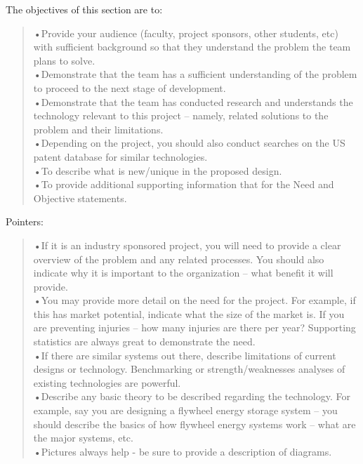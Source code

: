 \begin{enumerate}
\begin{onlysolution}
The objectives of this section are to:
\begin{quote}
•Provide your audience (faculty, project sponsors, other students, etc)
with sufficient background so that they understand the problem the team
plans to solve.\\
•Demonstrate that the team has a sufficient understanding of the problem
to proceed to the next stage of development.\\
•Demonstrate that the team has conducted research and understands the
technology relevant to this project -- namely, related solutions to the
problem and their limitations.\\
•Depending on the project, you should also conduct searches on the US
patent database for similar technologies.\\
•To describe what is new/unique in the proposed design.\\
•To provide additional supporting information that for the Need and
Objective statements.
\end{quote}

Pointers:
\begin{quote}
•If it is an industry sponsored project, you will need to provide a
clear overview of the problem and any related processes. You should also
indicate why it is important to the organization -- what benefit it will
provide.\\
•You may provide more detail on the need for the project. For example,
if this has market potential, indicate what the size of the market is.
If you are preventing injuries -- how many injuries are there per year?
Supporting statistics are always great to demonstrate the need.\\
•If there are similar systems out there, describe limitations of current
designs or technology. Benchmarking or strength/weaknesses analyses of existing
technologies are powerful.\\
•Describe any basic theory to be described regarding the technology. For
example, say you are designing a flywheel energy storage system -- you
should describe the basics of how flywheel energy systems work -- what
are the major systems, etc.\\
•Pictures always help - be sure to provide a description of diagrams.
\end{quote}


\end{onlysolution}
\end{enumerate}

